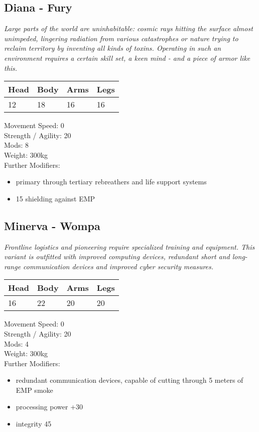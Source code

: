 \documentclass[12pt,a4paper,openany]{book}
\begin{document}
\begin{multicols}{2}
	\subsection{Diana - Fury}
	\textit{Large parts of the world are uninhabitable: cosmic rays hitting the surface almost unimpeded, lingering radiation from various catastrophes or nature trying to reclaim territory by inventing all kinds of toxins. Operating in such an environment requires a certain skill set, a keen mind - and a piece of armor like this.}\par
	\begin{tabular}{|l|l|l|l|}
		\hline
		Head & Body & Arms & Legs\\
		\hline
		12 & 18 & 16 & 16\\
		\hline
	\end{tabular}
	\par
	Movement Speed: 0\\
	Strength / Agility: 20\\
	Mods: 8\\
	Weight: 300kg\\
	Further Modifiers:
	\vspace{-8mm}
	\begin{itemize}
		\setlength\itemsep{-8mm}
		\item primary through tertiary rebreathers and life support systems
		\item 15 shielding against EMP
	\end{itemize}
	\par
	\subsection{Minerva - Wompa}
	\textit{Frontline logistics and pioneering require specialized training and equipment. This variant is outfitted with improved computing devices, redundant short and long-range communication devices and improved cyber security measures.}\par
	\begin{tabular}{|l|l|l|l|}
		\hline
		Head & Body & Arms & Legs\\
		\hline
		16 & 22 & 20 & 20\\
		\hline
	\end{tabular}
	\par
	Movement Speed: 0\\
	Strength / Agility: 20\\
	Mods: 4\\
	Weight: 300kg\\
	Further Modifiers:
	\vspace{-8mm}
	\begin{itemize}
		\setlength\itemsep{-8mm}
		\item redundant communication devices, capable of cutting through 5 meters of EMP smoke
		\item processing power +30
		\item integrity 45
	\end{itemize}
	\par

\end{multicols}
\end{document}
